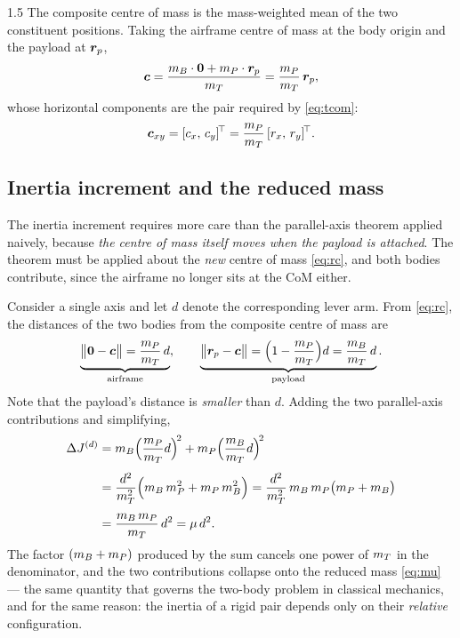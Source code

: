 \begin{spacing}{1.5}
The composite centre of mass is the mass-weighted mean of the two constituent
positions. Taking the airframe centre of mass at the body origin and the payload
at $\bm{r}_p$,
\begin{equation}
\bm{c} = \frac{m_B \cdot \bm{0} + m_P \cdot \bm{r}_p}{m_T}
= \frac{m_P}{m_T}\, \bm{r}_p ,
\label{eq:rc}
\end{equation}
whose horizontal components are the pair required by \eqref{eq:tcom}:
\begin{equation}
\bm{c}_{xy} = [c_x,\, c_y]^{\!\top} = \frac{m_P}{m_T}\, [r_x,\, r_y]^{\!\top}.
\label{eq:cxy}
\end{equation}

\subsection{Inertia increment and the reduced mass}\label{sec:model:paxis}

The inertia increment requires more care than the parallel-axis theorem applied
naively, because \emph{the centre of mass itself moves when the payload is
attached}. The theorem must be applied about the \emph{new} centre of mass
\eqref{eq:rc}, and both bodies contribute, since the airframe no longer sits at
the CoM either.

Consider a single axis and let $d$ denote the corresponding lever arm. From
\eqref{eq:rc}, the distances of the two bodies from the composite centre of mass
are
\begin{equation}
\underbrace{\bigl\| \bm{0} - \bm{c} \bigr\| = \frac{m_P}{m_T}\, d}_{\text{airframe}},
\qquad
\underbrace{\bigl\| \bm{r}_p - \bm{c} \bigr\| = \Bigl( 1 - \frac{m_P}{m_T} \Bigr) d = \frac{m_B}{m_T}\, d}_{\text{payload}} .
\label{eq:dists}
\end{equation}
Note that the payload's distance is \emph{smaller} than $d$. Adding the two
parallel-axis contributions and simplifying,
\begin{align}
\Delta J^{(d)}
&= m_B \Bigl( \frac{m_P}{m_T} d \Bigr)^{\!2}
 + m_P \Bigl( \frac{m_B}{m_T} d \Bigr)^{\!2} \nonumber \\[4pt]
&= \frac{d^2}{m_T^2}\Bigl( m_B\, m_P^2 + m_P\, m_B^2 \Bigr)
 = \frac{d^2}{m_T^2}\, m_B\, m_P \bigl( m_P + m_B \bigr) \nonumber \\[4pt]
&= \frac{m_B\, m_P}{m_T}\, d^2
 = \mu\, d^2 .
\label{eq:reduced}
\end{align}
The factor $(m_B + m_P)$ produced by the sum cancels one power of $m_T$ in the
denominator, and the two contributions collapse onto the reduced mass
\eqref{eq:mu} --- the same quantity that governs the two-body problem in
classical mechanics, and for the same reason: the inertia of a rigid pair depends
only on their \emph{relative} configuration.


\end{spacing}
